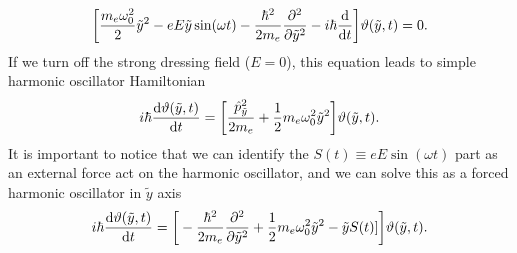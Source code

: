 \begin{equation} \label{eq_a6}
    \bigg[
    \frac{m_e \omega_0^2}{2}\tilde{y}^2
    - {eE\tilde{y}}\sin(\omega t)
    -
    \frac{\hbar^2}{2m_e}
    \pdv[2]{\tilde{y}}
    - i \hbar \dv{t}
    \bigg]
    \vartheta(\tilde{y},t) = 0.
\end{equation}
If we turn off the strong dressing field ($E=0$), this equation leads to simple harmonic oscillator Hamiltonian
\begin{equation} \label{eq_a7}
     i \hbar \dv{\vartheta(\tilde{y},t)}{t} =
    \bigg[
    \frac{\hat{p}_{\tilde{y}}^2}{2m_e} +
    \frac{1}{2}m_e \omega_0^2\tilde{y}^2
    \bigg]
    \vartheta(\tilde{y},t).
\end{equation}
It is important to notice that we can identify the $S(t) \equiv eE\sin(\omega t)$ part as an external force act on the harmonic oscillator, and we can solve this as a forced harmonic oscillator in $\tilde{y}$ axis
\begin{equation} \label{eq_a8}
  \begin{aligned}
    i \hbar \dv{\vartheta(\tilde{y},t)}{t} =
    \bigg[
    -
    \frac{\hbar^2}{2m_e}
    \pdv[2]{\tilde{y}} +
    \frac{1}{2}m_e \omega_0^2\tilde{y}^2
    - \tilde{y}S(t)]
    \bigg]
    \vartheta(\tilde{y},t).
  \end{aligned}
\end{equation}

